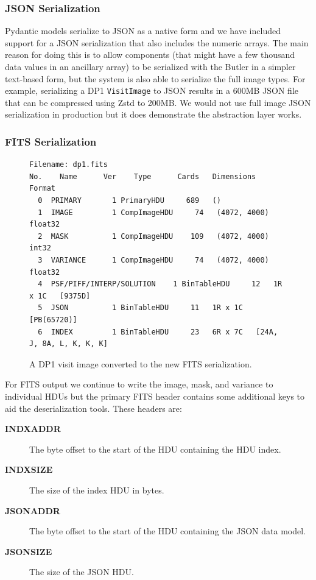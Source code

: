 \subsubsection{JSON Serialization}

Pydantic models serialize to JSON as a native form and we have included support for a JSON serialization that also includes the numeric arrays.
The main reason for doing this is to allow components (that might have a few thousand data values in an ancillary array) to be serialized with the Butler in a simpler text-based form, but the system is also able to serialize the full image types.
For example, serializing a DP1 \texttt{VisitImage} to JSON results in a 600MB JSON file that can be compressed using Zstd to 200MB.
We would not use full image JSON serialization in production but it does demonstrate the abstraction layer works.

\subsubsection{FITS Serialization}

\begin{figure}[!t]
  \begin{center}
    \begin{small}
      \begin{verbatim}
Filename: dp1.fits
No.    Name      Ver    Type      Cards   Dimensions   Format
  0  PRIMARY       1 PrimaryHDU     689   ()
  1  IMAGE         1 CompImageHDU     74   (4072, 4000)   float32
  2  MASK          1 CompImageHDU    109   (4072, 4000)   int32
  3  VARIANCE      1 CompImageHDU     74   (4072, 4000)   float32
  4  PSF/PIFF/INTERP/SOLUTION    1 BinTableHDU     12   1R x 1C   [9375D]
  5  JSON          1 BinTableHDU     11   1R x 1C   [PB(65720)]
  6  INDEX         1 BinTableHDU     23   6R x 7C   [24A, J, 8A, L, K, K, K]
      \end{verbatim}
    \end{small}
  \end{center}
  \caption{A DP1 visit image converted to the new FITS serialization.}
  \label{fig:new-fits}
\end{figure}

For FITS output we continue to write the image, mask, and variance to individual HDUs but the primary FITS header contains some additional keys to aid the deserialization tools.
These headers are:

\begin{description}
  \item[\textbf{INDXADDR}]
  The byte offset to the start of the HDU containing the HDU index.
  \item[\textbf{INDXSIZE}]
  The size of the index HDU in bytes.
  \item[\textbf{JSONADDR}]
  The byte offset to the start of the HDU containing the JSON data model.
  \item[\textbf{JSONSIZE}]
  The size of the JSON HDU.
\end{description}

